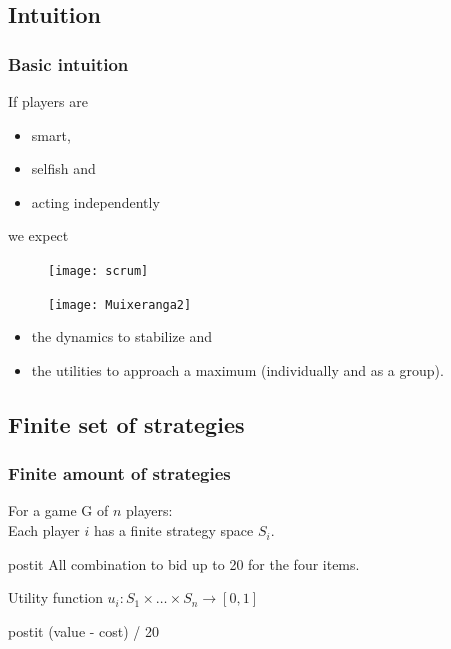 \documentclass{beamer}
\begin{document}
\subsection{Intuition}
\begin{frame}
	\frametitle{Basic intuition}
    If players are
		\begin{itemize}
			\item smart,
			\item selfish and
			\item acting independently
		\end{itemize}
		
	we expect\pause
	\begin{figure}[!tbp]
		\centering
		\begin{minipage}[b]{0.4\textwidth}
			\texttt{[image: scrum]} \pause
		\end{minipage}
		\hfill
		\begin{minipage}[b]{0.4\textwidth}
			\texttt{[image: Muixeranga2]} \pause
		\end{minipage}
	\end{figure}
	
	\begin{itemize}
		\item the dynamics to stabilize and
		\item the utilities to approach a maximum (individually and as a group).
	\end{itemize}
\end{frame}

\subsection{Finite set of strategies}
\begin{frame}
	\frametitle{Finite amount of strategies}
	For a game G of $n$ players:\\
	Each player $i$ has a finite strategy space $S_i$.
	
\pause
	\begin{beamercolorbox}[sep=1em]{postit}
		All combination to bid up to 20 for the four items.
	\end{beamercolorbox}
	\pause
	Utility function $u_i : S_1 \times \ldots \times S_n \rightarrow [0,1]$
	\pause
	\begin{beamercolorbox}[sep=1em]{postit}
		(value - cost) / 20
	\end{beamercolorbox}
\end{frame}
\end{document}
